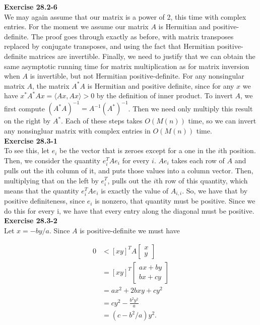 \documentclass{article}
\begin{document}
\noindent\textbf{Exercise 28.2-6}\\

We may again assume that our matrix is a power of 2, this time with complex entries. For the moment we assume our matrix $A$ is Hermitian and positive-definite. The proof goes through exactly as before, with matrix transposes replaced by conjugate transposes, and using the fact that Hermitian positive-definite matrices are invertible.  Finally, we need to justify that we can obtain the same asymptotic running time for matrix multiplication as for matrix inversion when $A$ is invertible, but not Hermitian positive-definite. For any nonsingular matrix $A$, the matrix $A^*A$ is Hermitian and positive definite, since for any $x$ we have $x^*A^*Ax = \langle Ax, Ax \rangle > 0$ by the definition of inner product. To invert $A$, we first compute $(A^*A)^{-1} = A^{-1} (A^*)^{-1}$.  Then we need only multiply this result on the right by $A^*$. Each of these steps takes $O(M(n))$ time, so we can invert any nonsingluar matrix with complex entries in $O(M(n))$ time. \\

\noindent\textbf{Exercise 28.3-1}\\

To see this, let $e_i$ be the vector that is zeroes except for a one in the $i$th position. Then, we consider the quantity $e_i^TAe_i$ for every $i$. $Ae_i$ takes each row of $A$ and pulls out the ith column of it, and puts those values into a column vector. Then, multiplying that on the left by $e_i^T$, pulls out the $i$th row of this quantity, which means that the quantity $e_i^TAe_i$ is exactly the value of $A_{i,i}$. So, we have that by positive definiteness, since $e_i$ is nonzero, that quantity must be positive. Since we do this for every i, we have that every entry along the diagonal must be positive.\\

\noindent\textbf{Exercise 28.3-2}\\

Let $x = -by/a$.  Since $A$ is positive-definite we must have 

\begin{align*}
0 & < [x y ]^T A  \left[ \begin{array}{c} x \\ y \end{array} \right] \\
&= [x y]^T \left[ \begin{array}{c} ax + by \\ bx + cy \end{array}\right] \\
&= ax^2 + 2bxy + cy^2 \\
&= cy^2 - \frac{b^2 y^2}{a} \\
&= (c-b^2/a)y^2.
\end{align*}
\end{document}
